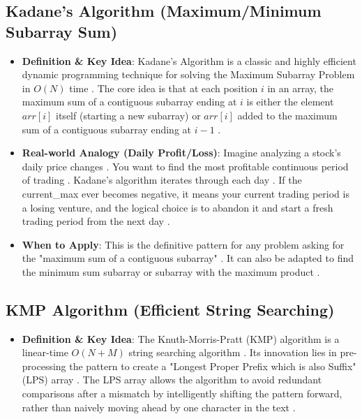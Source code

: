 \documentclass{article}
\begin{document}
\subsection{Kadane's Algorithm (Maximum/Minimum Subarray Sum)}
\begin{itemize}
\item \textbf{Definition \& Key Idea}: Kadane's Algorithm is a classic and highly efficient dynamic programming technique for solving the Maximum Subarray Problem in $O(N)$ time \cite{1041}. The core idea is that at each position $i$ in an array, the maximum sum of a contiguous subarray ending at $i$ is either the element $arr[i]$ itself (starting a new subarray) or $arr[i]$ added to the maximum sum of a contiguous subarray ending at $i-1$ \cite{1042}.
\item \textbf{Real-world Analogy (Daily Profit/Loss)}: Imagine analyzing a stock's daily price changes \cite{1043}. You want to find the most profitable continuous period of trading \cite{1044}. Kadane's algorithm iterates through each day \cite{1044}. If the current\_max ever becomes negative, it means your current trading period is a losing venture, and the logical choice is to abandon it and start a fresh trading period from the next day \cite{1048, 1049}.
\item \textbf{When to Apply}: This is the definitive pattern for any problem asking for the "maximum sum of a contiguous subarray" \cite{1065}. It can also be adapted to find the minimum sum subarray or subarray with the maximum product \cite{1066}.
\end{itemize}

\subsection{KMP Algorithm (Efficient String Searching)}
\begin{itemize}
\item \textbf{Definition \& Key Idea}: The Knuth-Morris-Pratt (KMP) algorithm is a linear-time $O(N+M)$ string searching algorithm \cite{1069}. Its innovation lies in pre-processing the pattern to create a "Longest Proper Prefix which is also Suffix" (LPS) array \cite{1070}. The LPS array allows the algorithm to avoid redundant comparisons after a mismatch by intelligently shifting the pattern forward, rather than naively moving ahead by one character in the text \cite{1072, 1073}.
\end{itemize}
\end{document}
